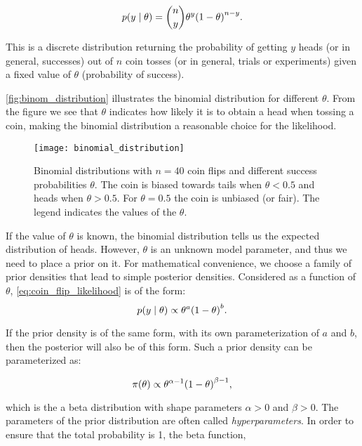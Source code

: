 \begin{equation}\label{eq:coin_flip_likelihood}
    p \qty(y \mid \theta) = \binom{n}{y} \theta^y \qty(1 - \theta)^{n-y}.
\end{equation}

This is a discrete distribution returning the probability of getting $y$ heads (or in general, successes) out of $n$ coin tosses (or in general, trials or experiments) given a fixed value of $\theta$ (probability of success). 

\autoref{fig:binom_distribution} illustrates the binomial distribution for different $\theta$. From the figure we see that $\theta$ indicates how likely it is to obtain a head when tossing a coin, making the binomial distribution a reasonable choice for the likelihood. 

\begin{figure}[H]
    \centering
    \texttt{[image: binomial\_distribution]}
    \caption{Binomial distributions with $n=40$ coin flips and different success probabilities $\theta$. The coin is biased towards tails when $\theta < 0.5$ and heads when $\theta > 0.5$. For $\theta=0.5$ the coin is unbiased (or fair). The legend indicates the values of the $\theta$.}
    \label{fig:binom_distribution}
\end{figure} 

If the value of $\theta$ is known, the binomial distribution tells us the expected distribution of heads. However, $\theta$ is an unknown model parameter, and thus we need to place a prior on it. For mathematical convenience, we choose a family of prior densities that lead to simple posterior densities. Considered as a function of $\theta$, \autoref{eq:coin_flip_likelihood} is of the form: 
\begin{equation*}
    p \qty(y \mid \theta) \propto \theta^a \qty(1 - \theta)^b.
\end{equation*} 

If the prior density is of the same form, with its own parameterization of $a$ and $b$, then the posterior will also be of this form. Such a prior density can be parameterized as: 

\begin{equation*}
    \pi \qty(\theta) \propto \theta^{\alpha - 1} \qty(1 - \theta)^{\beta -1},
\end{equation*}

which is the a beta distribution with shape parameters $\alpha>0$ and $\beta>0$. The parameters of the prior distribution are often called \textit{hyperparameters}. In order to ensure that the total probability is 1, the beta function,

